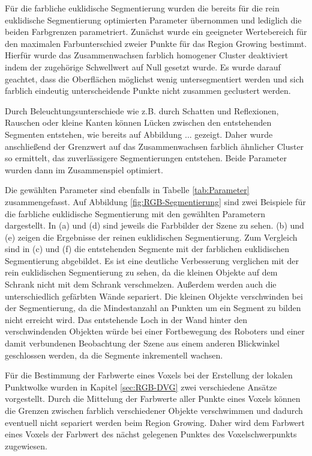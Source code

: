 Für die farbliche euklidische Segmentierung wurden die bereits für die rein euklidische Segmentierung optimierten Parameter übernommen und lediglich die beiden Farbgrenzen parametriert. Zunächst wurde ein geeigneter Wertebereich für den maximalen Farbunterschied zweier Punkte für das Region Growing bestimmt. Hierfür wurde das Zusammenwachsen farblich homogener Cluster deaktiviert indem der zugehörige Schwellwert auf Null gesetzt wurde. Es wurde darauf geachtet, dass die Oberflächen möglichst wenig untersegmentiert werden und sich farblich eindeutig unterscheidende Punkte nicht zusammen geclustert werden.  

Durch Beleuchtungsunterschiede wie z.B. durch Schatten und Reflexionen, Rauschen oder kleine Kanten können Lücken zwischen den entstehenden Segmenten entstehen, wie bereits auf Abbildung ... gezeigt. Daher wurde anschließend der Grenzwert auf das Zusammenwachsen farblich ähnlicher Cluster so ermittelt, das zuverlässigere Segmentierungen entstehen. Beide Parameter wurden dann im Zusammenspiel optimiert. 

Die gewählten Parameter sind ebenfalls in Tabelle \ref{tab:Parameter} zusammengefasst. Auf Abbildung \ref{fig:RGB-Segmentierung} sind zwei Beispiele für die farbliche euklidische Segmentierung mit den gewählten Parametern dargestellt. In (a) und (d) sind jeweils die Farbbilder der Szene zu sehen. (b) und (e) zeigen die Ergebnisse der reinen euklidischen Segmentierung. Zum Vergleich sind in (c) und (f) die entstehenden Segmente mit der farblichen euklidischen Segmentierung abgebildet. Es ist eine deutliche Verbesserung verglichen mit der rein euklidischen Segmentierung zu sehen, da die kleinen Objekte auf dem Schrank nicht mit dem Schrank verschmelzen. Außerdem werden auch die unterschiedlich gefärbten Wände separiert. Die kleinen Objekte verschwinden bei der Segmentierung, da die Mindestanzahl an Punkten um ein Segment zu bilden nicht erreicht wird. Das entstehende Loch in der Wand hinter den verschwindenden Objekten würde bei einer Fortbewegung des Roboters und einer damit verbundenen Beobachtung der Szene aus einem anderen Blickwinkel geschlossen werden, da die Segmente inkrementell wachsen. 

Für die Bestimmung der Farbwerte eines Voxels bei der Erstellung der lokalen Punktwolke wurden in Kapitel \ref{sec:RGB-DVG} zwei verschiedene Ansätze vorgestellt. Durch die Mittelung der Farbwerte aller Punkte eines Voxels können die Grenzen zwischen farblich verschiedener Objekte verschwimmen und dadurch eventuell nicht separiert werden beim Region Growing. Daher wird dem Farbwert eines Voxels der Farbwert des nächst gelegenen Punktes des Voxelschwerpunkts zugewiesen. 

